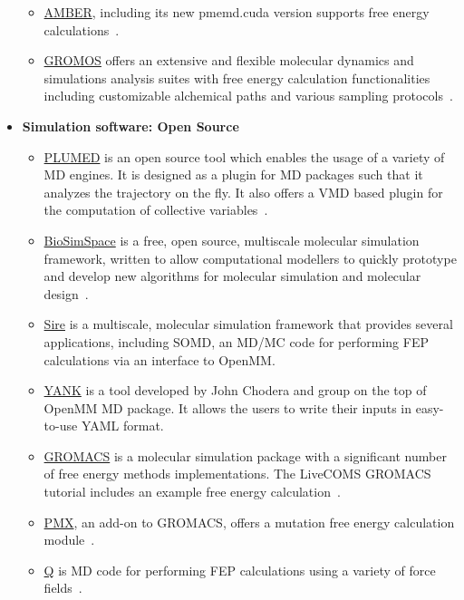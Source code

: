 \documentclass[9pt,bestpractices]{livecoms}
\begin{document}
\begin{itemize}
\begin{itemize}
	\item \href{https://ambermd.org/}{AMBER}, including its new pmemd.cuda version supports free energy calculations~\cite{salomon-ferrer2013overview}. 
	\item \href{http://www.gromos.net/}{GROMOS} offers an extensive and flexible molecular dynamics and simulations analysis suites with free energy calculation functionalities including customizable alchemical paths and various sampling protocols~\cite{schmid2012architecture, kunz2012new, eichenberger2011gromos}.
	\end{itemize}
\item [] \textbf{Simulation software: Open Source}
	\begin{itemize}
	\item \href{https://www.plumed.org/}{PLUMED} is an open source tool which enables the usage of a variety of MD engines. It is designed as a plugin for MD packages such that it analyzes the trajectory on the fly. It also offers a VMD based plugin for the computation of collective variables~\cite{bonomi2019promoting}.   	
	\item \href{https://biosimspace.org/}{BioSimSpace} is a free, open source, multiscale molecular simulation framework, written to allow computational modellers to quickly prototype and develop new algorithms for molecular simulation and molecular design~\cite{hedges2019biosimspace}. 
	\item \href{https://siremol.org/}{Sire} is a multiscale, molecular simulation framework that provides several applications, including SOMD, an MD/MC code for performing FEP calculations via an interface to OpenMM. 
	\item \href{http://getyank.org/latest/index.html}{YANK} is a tool developed by John Chodera and group on the top of OpenMM MD package. It allows the users to write their inputs in easy-to-use YAML format.
	\item \href{http://www.gromacs.org/}{GROMACS} is a molecular simulation package with a significant number of free energy methods implementations. The LiveCOMS GROMACS tutorial includes an example free energy calculation~\cite{lemkul2018From}.
	\item \href{http://pmx.mpibpc.mpg.de/instructions.html}{PMX}, an add-on to GROMACS, offers a mutation free energy calculation module~\cite{abraham2015gromacs}.
	\item \href{https://github.com/qusers/Q6}{Q} is MD code for performing FEP calculations using a variety of force fields~\cite{aqvistj.2017q6}. 

\end{itemize}
\end{itemize}
\end{document}
